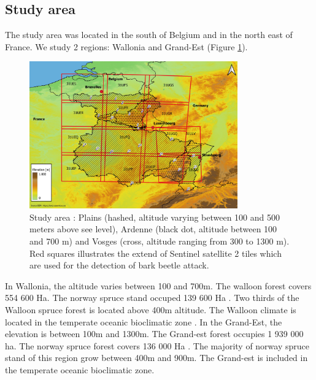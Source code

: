 \documentclass[3p,procedia]{elsarticle}
\begin{document}
\subsection{Study area}
The study area was located in the south of Belgium and in the north east of France. We study 2 regions: Wallonia and Grand-Est (Figure \ref{fig:situ}).
\begin{figure} [htbp] 
	\centering
	\includegraphics[width=0.8\textwidth]{gde.jpeg}
	\caption{Study area : Plains (hashed, altitude varying between 100 and 500 meters above see level), Ardenne (black dot, altitude between 100 and 700 m) and Vosges (cross, altitude ranging from 300 to 1300 m). Red squares illustrates the extend of Sentinel satellite 2 tiles which are used for the detection of bark beetle attack.}
	\label{fig:situ}
\end{figure}
In Wallonia, the altitude varies between 100 and 700m.
The walloon forest covers 554 600 Ha. 
The norway spruce stand occuped 139 600 Ha \citep{Alderweireld_2015}. 
Two thirds of the Walloon spruce forest is located above 400m altitude. 
The Walloon climate is located in the temperate oceanic bioclimatic zone \citep{lindner_climate_2010}. 
In the Grand-Est, the elevation is between 100m and 1300m. 
The Grand-est forest occupies 1 939 000 ha. 
The norway spruce forest covers 136 000 Ha \citep{IGN2022}. 
The majority of norway spruce stand of this region grow between 400m and 900m. 
The Grand-est is included in the temperate oceanic bioclimatic zone\citep{lindner_climate_2010}. 
\end{document}
